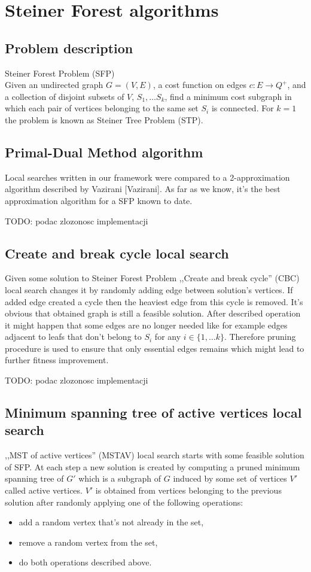 \chapter{Steiner Forest algorithms}

\section{Problem description}
Steiner Forest Problem (SFP)\\
Given an undirected graph $G = (V, E)$, a cost function on edges $c : E \rightarrow Q^+$, and a collection of disjoint subsets of $V$, $S_1, \dots S_k$, find a minimum cost subgraph in which each pair of vertices belonging to the same set $S_i$ is connected.
For $k = 1$ the problem is known as Steiner Tree Problem (STP).

\section{Primal-Dual Method algorithm}
Local searches written in our framework were compared to a 2-approximation algorithm described by Vazirani [Vazirani]. As far as we know, it's the best approximation algorithm for a SFP known to date.

TODO: podac zlozonosc implementacji

\section{Create and break cycle local search}
Given some solution to Steiner Forest Problem ,,Create and break cycle'' (CBC) local search changes it by randomly adding edge between solution's vertices. If added edge created a cycle then the heaviest edge from this cycle is removed. It's obvious that obtained graph is still a feasible solution. After described operation it might happen that some edges are no longer needed like for example edges adjacent to leafs that don't belong to $S_i$ for any $i \in \{1, \dots k\}$. Therefore pruning procedure is used to ensure that only essential edges remains which might lead to further fitness improvement.

TODO: podac zlozonosc implementacji

\section{Minimum spanning tree of active vertices local search}
,,MST of active vertices'' (MSTAV) local search starts with some feasible solution of SFP. At each step a new solution is created by computing a pruned minimum spanning tree of $G'$ which is a subgraph of $G$ induced by some set of vertices $V'$ called active vertices. $V'$ is obtained from vertices belonging to the previous solution after randomly applying one of the following operations:
\begin{itemize}
\item add a random vertex that's not already in the set,
\item remove a random vertex from the set,
\item do both operations described above.
\end{itemize}

